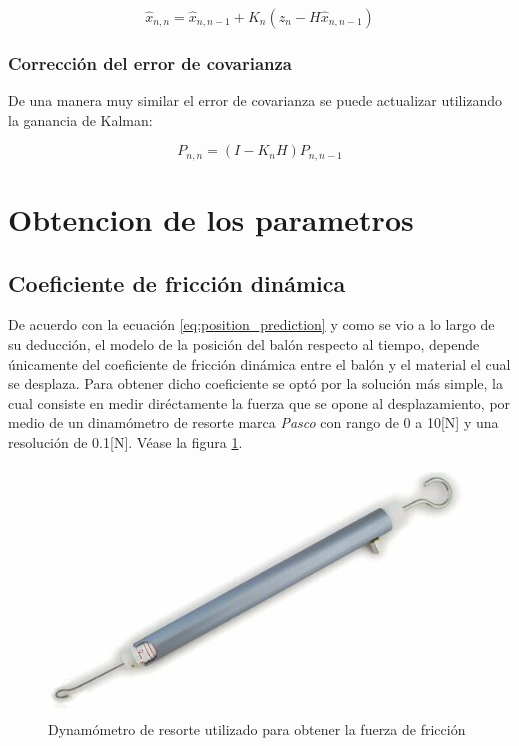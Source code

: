 \begin{equation}
\hat{x}_{n,n} = \hat{x}_{n,n-1} + K_n(z_n - H \hat{x}_{n,n-1})
\end{equation}
	
		\subsubsection*{Corrección del error de covarianza}
	De una manera muy similar el error de covarianza se puede actualizar utilizando la ganancia de Kalman:

\begin{equation}
P_{n,n} = (I - K_n H) P_{n,n-1}
\end{equation}

	\section{Obtencion de los parametros}
		\subsection*{Coeficiente de fricción dinámica}
	De acuerdo con la ecuación \ref{eq:position_prediction} y como se vio a lo largo de su deducción, el modelo de la posición del balón respecto al tiempo, depende únicamente del coeficiente de fricción dinámica entre el balón y el material el cual se desplaza. Para obtener dicho coeficiente se optó por la solución más simple, la cual consiste en medir diréctamente la fuerza que se opone al desplazamiento, por medio de un dinamómetro de resorte marca \textit{Pasco} con rango de 0 a 10[N] y una resolución de 0.1[N]. Véase la figura \ref{fig:dynamometer}. 
	
\begin{figure}
\centering
\includegraphics[scale=0.4]{images/dynamometer.jpg}
\caption{Dynamómetro de resorte utilizado para obtener la fuerza de fricción}
\label{fig:dynamometer}
\end{figure}	

